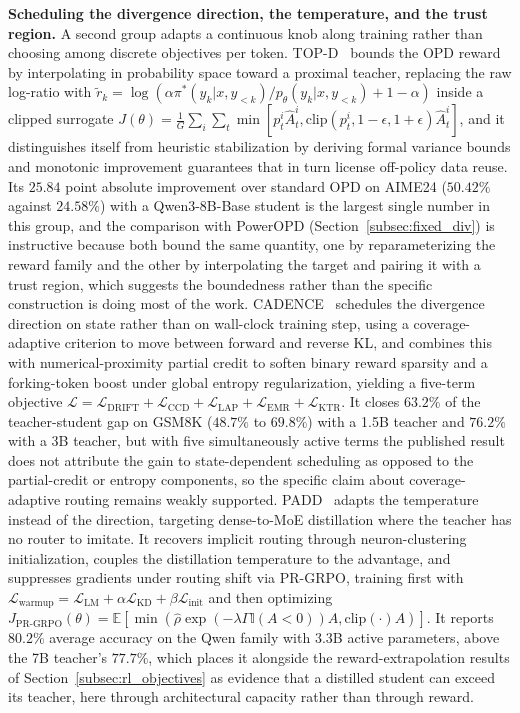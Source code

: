 \documentclass{article} %
\newcommand{\E}{\mathbb{E}}
\newcommand{\ptheta}{p_\theta}
\newcommand{\loss}{\mathcal{L}}
\begin{document}
\textbf{Scheduling the divergence direction, the temperature, and the trust region.} A second group adapts a continuous knob along training rather than choosing among discrete objectives per token. TOP-D~\citep{2607.04751} bounds the OPD reward by interpolating in probability space toward a proximal teacher, replacing the raw log-ratio with $\tilde r_k = \log(\alpha \pi^*(y_k|x,y_{<k})/\ptheta(y_k|x,y_{<k}) + 1-\alpha)$ inside a clipped surrogate $J(\theta) = \frac{1}{G}\sum_i \sum_t \min[p^i_t \hat A^i_t, \mathrm{clip}(p^i_t, 1-\epsilon, 1+\epsilon)\hat A^i_t]$, and it distinguishes itself from heuristic stabilization by deriving formal variance bounds and monotonic improvement guarantees that in turn license off-policy data reuse. Its $25.84$ point absolute improvement over standard OPD on AIME24 ($50.42\%$ against $24.58\%$) with a Qwen3-8B-Base student is the largest single number in this group, and the comparison with PowerOPD (Section~\ref{subsec:fixed_div}) is instructive because both bound the same quantity, one by reparameterizing the reward family and the other by interpolating the target and pairing it with a trust region, which suggests the boundedness rather than the specific construction is doing most of the work. CADENCE~\citep{2607.16955} schedules the divergence direction on state rather than on wall-clock training step, using a coverage-adaptive criterion to move between forward and reverse KL, and combines this with numerical-proximity partial credit to soften binary reward sparsity and a forking-token boost under global entropy regularization, yielding a five-term objective $\loss = \loss_{\mathrm{DRIFT}} + \loss_{\mathrm{CCD}} + \loss_{\mathrm{LAP}} + \loss_{\mathrm{EMR}} + \loss_{\mathrm{KTR}}$. It closes $63.2\%$ of the teacher-student gap on GSM8K ($48.7\%$ to $69.8\%$) with a 1.5B teacher and $76.2\%$ with a 3B teacher, but with five simultaneously active terms the published result does not attribute the gain to state-dependent scheduling as opposed to the partial-credit or entropy components, so the specific claim about coverage-adaptive routing remains weakly supported. PADD~\citep{2606.10369} adapts the temperature instead of the direction, targeting dense-to-MoE distillation where the teacher has no router to imitate. It recovers implicit routing through neuron-clustering initialization, couples the distillation temperature to the advantage, and suppresses gradients under routing shift via PR-GRPO, training first with $\loss_{\mathrm{warmup}} = \loss_{\mathrm{LM}} + \alpha \loss_{\mathrm{KD}} + \beta \loss_{\mathrm{init}}$ and then optimizing $J_{\text{PR-GRPO}}(\theta) = \E[\min(\hat\rho \exp(-\lambda\Gamma \mathbb{I}(A<0))A, \mathrm{clip}(\cdot)A)]$. It reports $80.2\%$ average accuracy on the Qwen family with $3.3$B active parameters, above the 7B teacher's $77.7\%$, which places it alongside the reward-extrapolation results of Section~\ref{subsec:rl_objectives} as evidence that a distilled student can exceed its teacher, here through architectural capacity rather than through reward.
\end{document}
